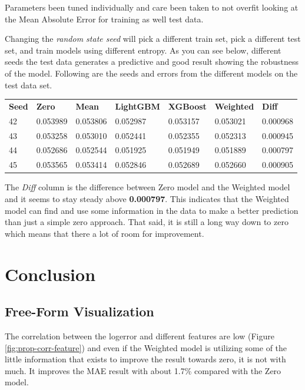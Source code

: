 \documentclass[a4paper]{article}
\begin{document}
Parameters been tuned individually and care been taken to not overfit looking at the Mean Absolute Error for training as well test data.

Changing the \textit{random state seed} will pick a different train set, pick a different test set, and train models using different entropy. As you can see below, different seeds the test data generates a predictive and good result showing the robustness of the model. Following are the seeds and errors from the different models on the test data set.
\begin{center}
\begin{tabular}{ l l l l l l l }
    \textbf{Seed} & \textbf{Zero} & \textbf{Mean} & \textbf{LightGBM} & \textbf{XGBoost} & \textbf{Weighted} & \textbf{Diff} \\
    42 & 0.053989 & 0.053806 & 0.052987 & 0.053157 & 0.053021 & 0.000968 \\
    43 & 0.053258 & 0.053010 & 0.052441 & 0.052355 & 0.052313 & 0.000945 \\
    44 & 0.052686 & 0.052544 & 0.051925 & 0.051949 & 0.051889 & 0.000797 \\
    45 & 0.053565 & 0.053414 & 0.052846 & 0.052689 & 0.052660 & 0.000905 \\
\end{tabular}
\end{center}
The \textit{Diff} column is the difference between Zero model and the Weighted model and it seems to stay steady above \textbf{0.000797}. This indicates that the Weighted model can find and use some information in the data to make a better prediction than just a simple zero approach. That said, it is still a long way down to zero which means that there a lot of room for improvement.


\section{Conclusion}

\subsection{Free-Form Visualization}
The correlation between the logerror and different features are low (Figure \ref{fig:prop-corr-feature}) and even if the Weighted model is utilizing some of the little information that exists to improve the result towards zero, it is not with much. It improves the MAE result with about 1.7\% compared with the Zero model. 
\end{document}
